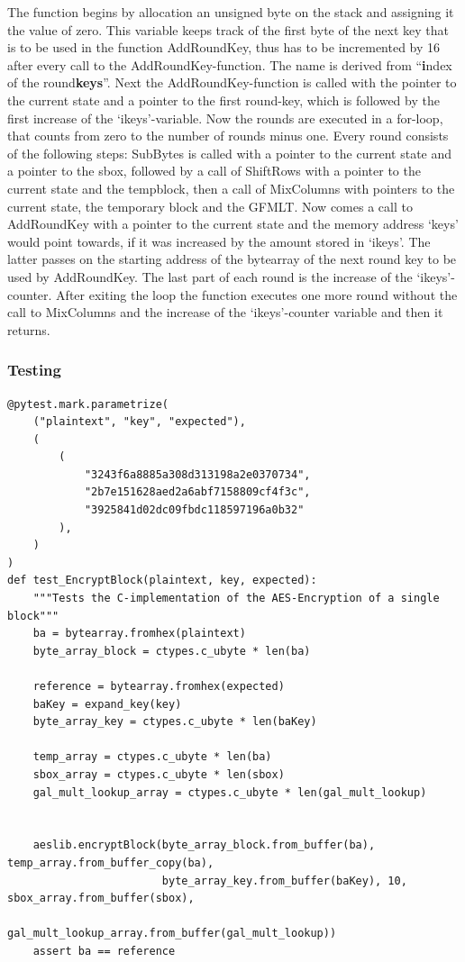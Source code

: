The function begins by allocation an unsigned byte on the stack and
assigning it the value of zero. This variable keeps track of the first
byte of the next key that is to be used in the function AddRoundKey,
thus has to be incremented by 16 after every call to the
AddRoundKey-function. The name is derived from ``\textbf{i}ndex of the
round\textbf{keys}''. Next the AddRoundKey-function is called with the
pointer to the current state and a pointer to the first round-key, which
is followed by the first increase of the `ikeys'-variable. Now the
rounds are executed in a for-loop, that counts from zero to the number
of rounds minus one. Every round consists of the following steps:
SubBytes is called with a pointer to the current state and a pointer to
the sbox, followed by a call of ShiftRows with a pointer to the current
state and the tempblock, then a call of MixColumns with pointers to the
current state, the temporary block and the GFMLT. Now comes a call to
AddRoundKey with a pointer to the current state and the memory address
`keys' would point towards, if it was increased by the amount stored in
`ikeys'. The latter passes on the starting address of the bytearray of
the next round key to be used by AddRoundKey. The last part of each
round is the increase of the `ikeys'-counter. After exiting the loop the
function executes one more round without the call to MixColumns and the
increase of the `ikeys'-counter variable and then it returns.

\hypertarget{testing-6}{%
\subsubsection{Testing}\label{testing-6}}

\begin{lstlisting}
@pytest.mark.parametrize(
    ("plaintext", "key", "expected"),
    (
        (
            "3243f6a8885a308d313198a2e0370734",
            "2b7e151628aed2a6abf7158809cf4f3c",
            "3925841d02dc09fbdc118597196a0b32"
        ),
    )
)
def test_EncryptBlock(plaintext, key, expected):
    """Tests the C-implementation of the AES-Encryption of a single block"""
    ba = bytearray.fromhex(plaintext)
    byte_array_block = ctypes.c_ubyte * len(ba)

    reference = bytearray.fromhex(expected)
    baKey = expand_key(key)
    byte_array_key = ctypes.c_ubyte * len(baKey)

    temp_array = ctypes.c_ubyte * len(ba)
    sbox_array = ctypes.c_ubyte * len(sbox)
    gal_mult_lookup_array = ctypes.c_ubyte * len(gal_mult_lookup)
    

    aeslib.encryptBlock(byte_array_block.from_buffer(ba), temp_array.from_buffer_copy(ba),
                        byte_array_key.from_buffer(baKey), 10, sbox_array.from_buffer(sbox),
                        gal_mult_lookup_array.from_buffer(gal_mult_lookup))
    assert ba == reference
\end{lstlisting}

